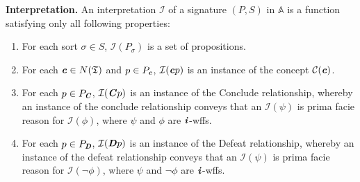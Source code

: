 \documentclass[10pt, conference, compsocconf]{IEEEtran}
\begin{document}
\begin{definition}\label{def:interpretation}
	\textbf{Interpretation.} An interpretation $\mathcal{I}$ of a signature $(P, S)$ in $\mathbb{A}$ is a function satisfying only all following properties:
	\begin{enumerate}
		\item{For each sort $\sigma \in S$, $\mathcal{I}(P_{\sigma})$ is a set of propositions.}
		\item{For each $\textbf{\textit{c}} \in N(\mathfrak{T})$ and $p \in P_{\textbf{\textit{c}}}$, $\mathcal{I}(\textbf{\textit{c}}p)$ is an instance of the concept $\mathcal{C}(\textbf{\textit{c}})$.}
		\item{For each $p \in P_{\textbf{\textit{C}}}$, $\mathcal{I}(\textbf{\textit{C}}p)$ is an instance of the \textsf{Conclude} relationship, whereby an instance of the conclude relationship conveys that an $\mathcal{I}(\psi)$ is prima facie reason for $\mathcal{I}(\phi)$, where $\psi$ and $\phi$ are $\textbf{\textit{i}}$-wffs.}
		\item{For each $p \in P_{\textbf{\textit{D}}}$, $\mathcal{I}(\textbf{\textit{D}}p)$ is an instance of the \textsf{Defeat} relationship, whereby an instance of the defeat relationship conveys that an $\mathcal{I}(\psi)$ is prima facie reason for $\mathcal{I}(\neg\phi)$, where $\psi$ and $\neg\phi$ are $\textbf{\textit{i}}$-wffs.}

\end{enumerate}
\end{definition}
\end{document}
